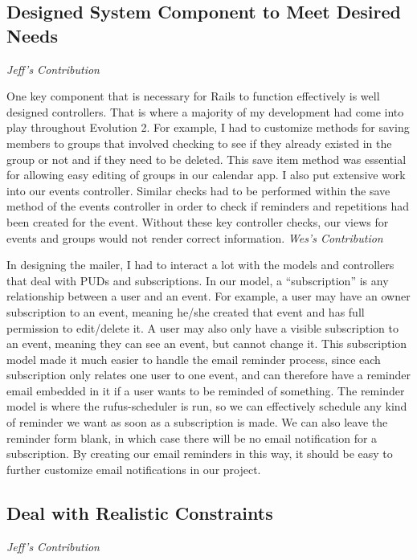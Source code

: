 \documentclass[11pt]{article}
\begin{document}
\subsection{Designed System Component to Meet Desired Needs}

\textit{Jeff's Contribution}

One key component that is necessary for Rails to function effectively is well designed controllers.  That is where a majority of my development had come into play throughout Evolution 2.  For example, I had to customize methods for saving members to groups that involved checking to see if they already existed in the group or not and if they need to be deleted.  This save item method was essential for allowing easy editing of groups in our calendar app.  I also put extensive work into our events controller.  Similar checks had to be performed within the save method of the events controller in order to check if reminders and repetitions had been created for the event.  Without these key controller checks, our views for events and groups would not render correct information.
\textit{Wes's Contribution}

In designing the mailer, I had to interact a lot with the models and controllers that deal with PUDs and subscriptions.  In our model, a “subscription” is any relationship between a user and an event.  For example, a user may have an owner subscription to an event, meaning he/she created that event and has full permission to edit/delete it.  A user may also only have a visible subscription to an event, meaning they can see an event, but cannot change it.  This subscription model made it much easier to handle the email reminder process, since each subscription only relates one user to one event, and can therefore have a reminder email embedded in it if a user wants to be reminded of something.  The reminder model is where the rufus-scheduler is run, so we can effectively schedule any kind of reminder we want as soon as a subscription is made.  We can also leave the reminder form blank, in which case there will be no email notification for a subscription.  By creating our email reminders in this way, it should be easy to further customize email notifications in our project.

\subsection{Deal with Realistic Constraints}

\textit{Jeff's Contribution}
\end{document}
